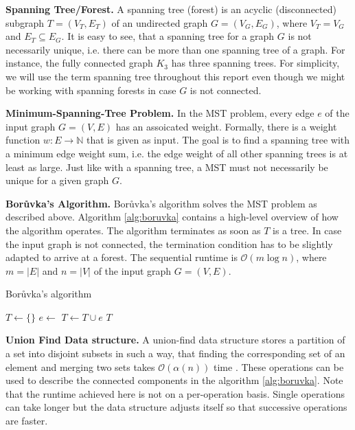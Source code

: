 \documentclass[letterpaper]{article}
\newcommand{\N}[0]{\mathbb{N}}
\newcommand{\bigoh}{\mathcal O}
\newcommand{\mypar}[1]{{\bf #1.}}
\begin{document}
\mypar{Spanning Tree/Forest}
A spanning tree (forest) is an acyclic (disconnected) subgraph $T = (V_T, E_T)$ of an undirected graph $G = (V_G, E_G)$,
where $V_T = V_G$ and $E_T \subseteq E_G$. It is easy to see, that a spanning tree for a graph $G$ is not necessarily
unique, i.e. there can be more than one spanning tree of a graph. For instance, the fully connected graph $K_3$ has
three spanning trees. For simplicity, we will use the term spanning tree throughout this report even though we might be
working with spanning forests in case $G$ is not connected.

\mypar{Minimum-Spanning-Tree Problem}
In the MST problem, every edge $e$ of the input graph $G = (V, E)$ has an assoicated weight. Formally, there is a weight
function $w : E \to \N$ that is given as input. The goal is to find a spanning tree with a minimum edge weight sum, i.e.
the edge weight of all other spanning trees is at least as large. Just like with a spanning tree, a MST must not
necessarily be unique for a given graph $G$.

\mypar{Bor\r{u}vka's Algorithm}
Bor\r{u}vka's algorithm \cite{boruuvka1926jistem, nevsetvril2001otakar} solves the MST problem as described above.
Algorithm \ref{alg:boruvka} contains a high-level overview of how the algorithm operates. The algorithm terminates as
soon as $T$ is a tree. In case the input graph is not connected, the termination condition has to be slightly adapted to
arrive at a forest. The sequential runtime is $\bigoh(m \log n)$, where $m = |E|$ and $n = |V|$ of the input graph $G =
(V, E)$.

\begin{algorithm}[!t]
  \caption{Bor\r{u}vka's algorithm}
  \label{alg:boruvka}
  \begin{algorithmic}
    \State $T \gets \{ \}$
        \State $e \gets$ 
        \State $T \gets T \cup e$
      \EndFor
      \State {}
    \EndWhile
    \State \Return $T$
  \end{algorithmic}
\end{algorithm}

\mypar{Union Find Data structure}
A union-find data structure stores a partition of a set into disjoint subsets in such a way, that finding the
corresponding set of an element and merging two sets takes $\bigoh(\alpha(n))$ time \cite{efficiency_union_find}. These
operations can be used to describe the connected components in the algorithm \ref{alg:boruvka}. Note that the runtime
achieved here is not on a per-operation basis. Single operations can take longer but the data structure adjusts itself
so that successive operations are faster.
\end{document}
